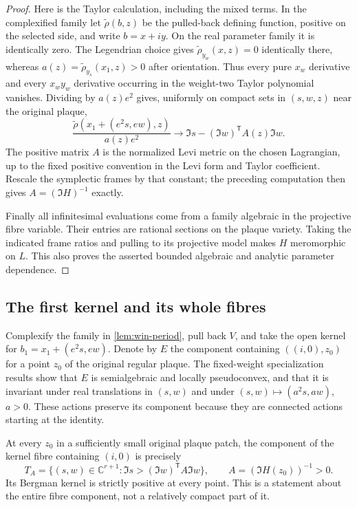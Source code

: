 \begin{proof}
Here is the Taylor calculation, including the mixed terms.  In the complexified family let $\widetilde\rho(b,z)$ be the pulled-back defining function, positive on the selected side, and write $b=x+iy$.  On the real parameter family it is identically zero.  The Legendrian choice gives $\widetilde\rho_{y_w}(x,z)=0$ identically there, whereas $a(z)=\widetilde\rho_{y_s}(x_1,z)>0$ after orientation.  Thus every pure $x_w$ derivative and every $x_wy_w$ derivative occurring in the weight-two Taylor polynomial vanishes.  Dividing by $a(z)e^2$ gives, uniformly on compact sets in $(s,w,z)$ near the original plaque,
\[
 \frac{\widetilde\rho(x_1+(e^2s,ew),z)}{a(z)e^2}
       \longrightarrow\Im s-(\Im w)^{\mathsf T}A(z)\Im w.
\]
The positive matrix $A$ is the normalized Levi metric on the chosen Lagrangian, up to the fixed positive convention in the Levi form and Taylor coefficient.  Rescale the symplectic frames by that constant; the preceding computation then gives $A=(\Im H)^{-1}$ exactly.

Finally all infinitesimal evaluations come from a family algebraic in the projective fibre variable.  Their entries are rational sections on the plaque variety.  Taking the indicated frame ratios and pulling to its projective model makes $H$ meromorphic on $L$.  This also proves the asserted bounded algebraic and analytic parameter dependence.
\end{proof}

\subsection{The first kernel and its whole fibres}

Complexify the family in \cref{lem:win-period}, pull back $V$, and take the open kernel for $b_1=x_1+(e^2s,ew)$.  Denote by $E$ the component containing $((i,0),z_0)$ for a point $z_0$ of the original regular plaque. The fixed-weight specialization results show that $E$ is semialgebraic and locally pseudoconvex, and that it is invariant under real translations in $(s,w)$ and under $(s,w)\mapsto(a^2s,aw)$, $a>0$. These actions preserve its component because they are connected actions starting at the identity.

\begin{lemma}\label{lem:win-seed-bergman}
At every $z_0$ in a sufficiently small original plaque patch, the component of the kernel fibre containing $(i,0)$ is precisely
\[
 T_A=\{(s,w)\in\mathbb{C}^{r+1}:\Im s>(\Im w)^{\mathsf T}A\Im w\},
                    \qquad A=(\Im H(z_0))^{-1}>0.
\]
Its Bergman kernel is strictly positive at every point.  This is a statement about the entire fibre component, not a relatively compact part of it.
\end{lemma}

